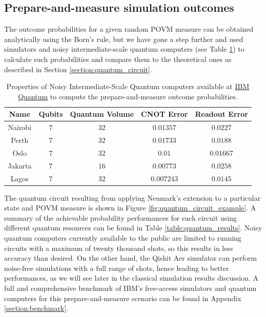 \subsection{Prepare-and-measure simulation outcomes}
The outcome probabilities for a given random POVM measure can be obtained analytically using the Born's rule, but we have gone a step further and used simulators and noisy intermediate-scale quantum computers (see Table \ref{table:quantum_resources}) to calculate such probabilities and compare them to the theoretical ones as described in Section \ref{section:quantum_circuit}. 
\newline
\begin{table}[h!]
\centering
{\renewcommand{\arraystretch}{1.2}%
\begin{tabular}{c c c c c} 
 \toprule
 Name & Qubits & Quantum Volume & CNOT Error & Readout Error \\ \hline
 Nairobi    & $\scriptstyle7$ 
            & $\scriptstyle32$ 
            & $\scriptstyle0.01357$ 
            & $\scriptstyle0.0227$ \\ \hline
 Perth      & $\scriptstyle7$ 
            & $\scriptstyle32$ 
            & $\scriptstyle0.01733$ 
            & $\scriptstyle0.0188$ \\ \hline
 Oslo       & $\scriptstyle7$ 
            & $\scriptstyle32$ 
            & $\scriptstyle0.01$ 
            & $\scriptstyle0.01667$ \\ \hline
 Jakarta    & $\scriptstyle7$ 
            & $\scriptstyle16$ 
            & $\scriptstyle0.00773$ 
            & $\scriptstyle0.0258$ \\ \hline
 Lagos      & $\scriptstyle7$ 
            & $\scriptstyle32$ 
            & $\scriptstyle0.007243$ 
            & $\scriptstyle0.0145$ \\ 
 \bottomrule
\end{tabular}}
\caption{Properties of Noisy Intermediate-Scale Quantum computers available at \href{https://quantum-computing.ibm.com}{IBM Quantum} to compute the prepare-and-measure outcome probabilities.}
\label{table:quantum_resources}
\end{table}

The quantum circuit resulting from applying Neumark's extension to a particular state and POVM measure is shown in Figure \ref{fig:quantum_circuit_example}. A summary of the achievable probability performances for such circuit using different quantum resources can be found in Table \ref{table:quantum_results}. Noisy quantum computers currently available to the public are limited to running circuits with a maximum of twenty thousand shots, so this results in less accuracy than desired. On the other hand, the Qiskit Aer simulator can perform noise-free simulations with a full range of shots, hence leading to better performances, as we will see later in the classical simulation results discussion. A full and comprehensive benchmark of IBM's free-access simulators and quantum computers for this prepare-and-measure scenario can be found in Appendix \ref{section:benchmark}.

